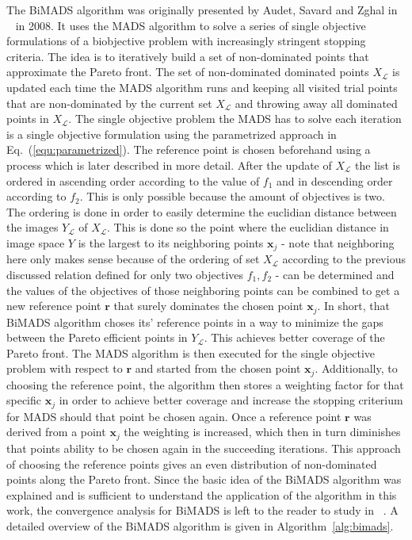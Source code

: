 \documentclass[a4paper,10pt]{article}
\renewcommand{\vec}[1]{\mathbf{#1}}
\newcommand{\equref}[1]{Eq.~(\ref{#1})}
\newcommand{\algref}[1]{Algorithm~\ref{#1}}
\begin{document}
    The BiMADS algorithm was originally presented by Audet, Savard and Zghal
    in ~\cite{multiobjective} in 2008.
    It uses the MADS algorithm to solve a series of single objective formulations
    of a biobjective problem with increasingly stringent stopping criteria.
    The idea is to iteratively build a set of non-dominated points that
    approximate the Pareto front.
    The set of non-dominated dominated points $X_{\mathcal{L}}$ is updated
    each time the MADS algorithm runs and keeping all visited trial points that
    are non-dominated by the current set $X_{\mathcal{L}}$ and throwing
    away all dominated points in $X_{\mathcal{L}}$.
    The single objective problem the MADS has to solve each iteration is
    a single objective formulation using the parametrized approach in
    \equref{equ:parametrized}.
    The reference point is chosen beforehand using a process which is later
    described in more detail.
    After the update of $X_{\mathcal{L}}$ the list is ordered in ascending
    order according to the value of $f_1$ and in descending order according 
    to $f_2$.
    This is only possible because the amount of objectives is two.
    The ordering is done in order to easily determine the euclidian distance
    between the images $Y_{\mathcal{L}}$ of $X_{\mathcal{L}}$.
    This is done so the point where the euclidian distance in image space $Y$
    is the largest to its neighboring points $\vec{x}_j$ - note that neighboring here only
    makes sense because of the ordering of set $X_{\mathcal{L}}$ according 
    to the previous discussed relation defined for only two objectives
    $f_1, f_2$ - can be determined and the values of the objectives of
    those neighboring points can be combined to get a new reference point $\vec{r}$
    that surely dominates the chosen point $\vec{x}_j$.
    In short, that BiMADS algorithm choses its' reference points in a
    way to minimize the gaps between the Pareto efficient points in $Y_{\mathcal{L}}$.
    This achieves better coverage of the Pareto front.
    The MADS algorithm is then executed for the single objective problem
    with respect to $\vec{r}$ and started from the chosen point $\vec{x}_j$.
    Additionally, to choosing the reference point, the algorithm then stores
    a weighting factor for that specific $\vec{x}_j$ in order to achieve
    better coverage and increase the stopping criterium for MADS should
    that point be chosen again.
    Once a reference point $\vec{r}$ was derived from a point $\vec{x}_j$ the
    weighting is increased, which then in turn diminishes that points
    ability to be chosen again in the succeeding iterations.
    This approach of choosing the reference points gives an even distribution
    of non-dominated points along the Pareto front.
    Since the basic idea of the BiMADS algorithm was explained and is
    sufficient to understand the application of the algorithm in this
    work, the convergence analysis for BiMADS is left to the reader
    to study in ~\cite{multiobjective}.
    A detailed overview of the BiMADS algorithm is given in \algref{alg:bimads}.
\end{document}
